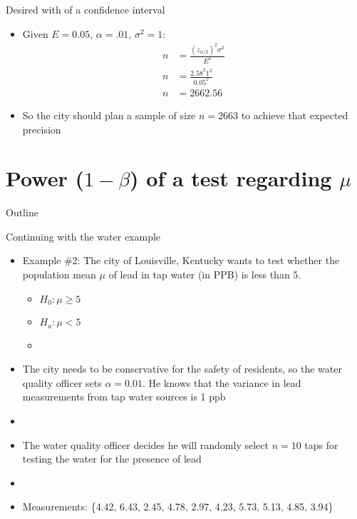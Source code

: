 \documentclass[xcolor=dvipsnames]{beamer}
\begin{document}
\begin{frame}{Desired with of a confidence interval}
\begin{itemize}
	\item Given $E = 0.05$, $\alpha = .01$, $\sigma^2 = 1$: \pause
	\begin{align*}
		n &= \frac{(z_{\alpha/2})^2 \sigma^2}{E^2}\\
		n &=\frac{2.58^2 1^2}{0.05^2} \\
		n &= 2662.56
	\end{align*} \pause
	\item So the city should plan a sample of size $n = 2663$ to achieve that expected precision
\end{itemize}
\end{frame}

\section{Power ($1-\beta$) of a test regarding $\mu$}

\begin{frame}{Outline}
	\tableofcontents[currentsection,subsectionstyle=show/shaded/hide]
\end{frame}

\begin{frame}{Continuing with the water example}
	\begin{itemize}
		\item Example \#2: The city of Louisville, Kentucky wants to test whether the population mean $\mu$ of lead in tap water (in PPB) is less than 5. \pause
		\begin{itemize}
			\item $H_0: \mu \geq 5$
			\item $H_a: \mu < 5$
			\item[]
		\end{itemize} \pause
		\item The city needs to be conservative for the safety of residents, so the water quality officer sets $\alpha = 0.01$. He knows that the variance in lead measurements from tap water sources is 1 ppb \pause
		\item[]
		\item The water quality officer decides he will randomly select $n=10$ taps for testing the water for the presence of lead \pause
		\item[]
		\item Measurements: \{4.42, 6.43, 2.45, 4.78, 2.97, 4.23, 5.73, 5.13, 4.85, 3.94\}
	\end{itemize}
\end{frame}
\end{document}
